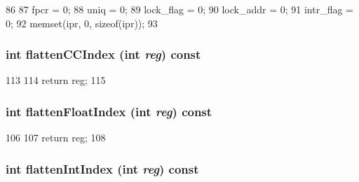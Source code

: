 \begin{DoxyCode}
86         {
87             fpcr = 0;
88             uniq = 0;
89             lock_flag = 0;
90             lock_addr = 0;
91             intr_flag = 0;
92             memset(ipr, 0, sizeof(ipr));
93         }
\end{DoxyCode}
\hypertarget{classAlphaISA_1_1ISA_a7a5d7476bd10e5af09e6e753d1fca087}{
\subsubsection[{flattenCCIndex}]{\setlength{\rightskip}{0pt plus 5cm}int flattenCCIndex (int {\em reg}) const}}
\label{classAlphaISA_1_1ISA_a7a5d7476bd10e5af09e6e753d1fca087}



\begin{DoxyCode}
113         {
114             return reg;
115         }
\end{DoxyCode}
\hypertarget{classAlphaISA_1_1ISA_a85addcd4f57c5a0ffa81805dcad1eeb7}{
\subsubsection[{flattenFloatIndex}]{\setlength{\rightskip}{0pt plus 5cm}int flattenFloatIndex (int {\em reg}) const}}
\label{classAlphaISA_1_1ISA_a85addcd4f57c5a0ffa81805dcad1eeb7}



\begin{DoxyCode}
106         {
107             return reg;
108         }
\end{DoxyCode}
\hypertarget{classAlphaISA_1_1ISA_aece4b88ffcab608652e8e9f0fbe643d4}{
\subsubsection[{flattenIntIndex}]{\setlength{\rightskip}{0pt plus 5cm}int flattenIntIndex (int {\em reg}) const}}
\label{classAlphaISA_1_1ISA_aece4b88ffcab608652e8e9f0fbe643d4}



